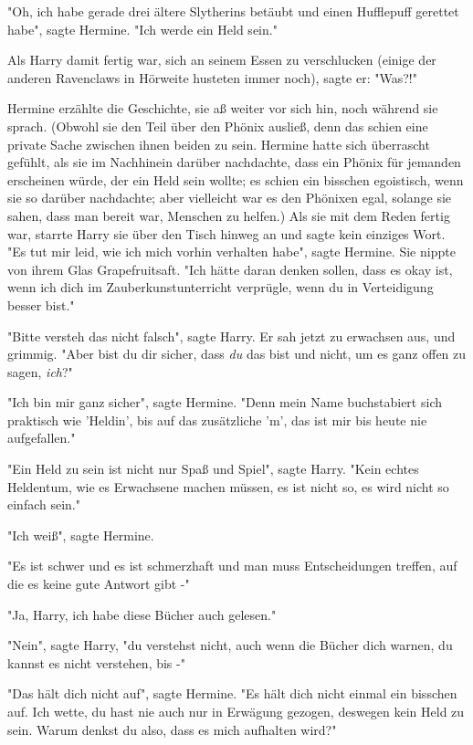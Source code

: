 {"Oh, ich habe gerade drei ältere Slytherins betäubt und einen Hufflepuff gerettet habe", sagte Hermine. "Ich werde ein Held sein."

Als Harry damit fertig war, sich an seinem Essen zu verschlucken (einige der anderen Ravenclaws in Hörweite husteten immer noch), sagte er: "Was?!"

Hermine erzählte die Geschichte, sie aß weiter vor sich hin, noch während sie sprach. (Obwohl sie den Teil über den Phönix ausließ, denn das schien eine private Sache zwischen ihnen beiden zu sein. Hermine hatte sich überrascht gefühlt, als sie im Nachhinein darüber nachdachte, dass ein Phönix für jemanden erscheinen würde, der ein Held sein wollte; es schien ein bisschen egoistisch, wenn sie so darüber nachdachte; aber vielleicht war es den Phönixen egal, solange sie sahen, dass man bereit war, Menschen zu helfen.) Als sie mit dem Reden fertig war, starrte Harry sie über den Tisch hinweg an und sagte kein einziges Wort. "Es tut mir leid, wie ich mich vorhin verhalten habe", sagte Hermine. Sie nippte von ihrem Glas Grapefruitsaft. "Ich hätte daran denken sollen, dass es okay ist, wenn ich dich im Zauberkunstunterricht verprügle, wenn du in Verteidigung besser bist."

"Bitte versteh das nicht falsch", sagte Harry. Er sah jetzt zu erwachsen aus, und grimmig. "Aber bist du dir sicher, dass \emph{du} das bist und nicht, um es ganz offen zu sagen, \emph{ich}?"

"Ich bin mir ganz sicher", sagte Hermine. "Denn mein Name buchstabiert sich praktisch wie 'Heldin', bis auf das zusätzliche 'm', das ist mir bis heute nie aufgefallen."

"Ein Held zu sein ist nicht nur Spaß und Spiel", sagte Harry. "Kein echtes Heldentum, wie es Erwachsene machen müssen, es ist nicht so, es wird nicht so einfach sein."

"Ich weiß", sagte Hermine.

"Es ist schwer und es ist schmerzhaft und man muss Entscheidungen treffen, auf die es keine gute Antwort gibt -"

"Ja, Harry, ich habe diese Bücher auch gelesen."

"Nein", sagte Harry, "du verstehst nicht, auch wenn die Bücher dich warnen, du kannst es nicht verstehen, bis -"

"Das hält dich nicht auf", sagte Hermine. "Es hält dich nicht einmal ein bisschen auf. Ich wette, du hast nie auch nur in Erwägung gezogen, deswegen kein Held zu sein. Warum denkst du also, dass es mich aufhalten wird?"

}
